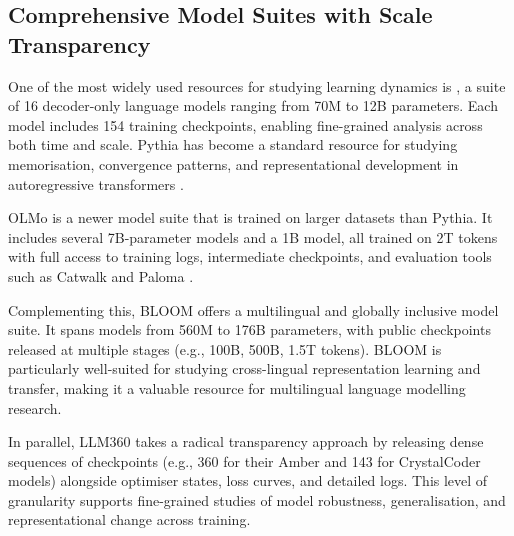 
\subsection{Comprehensive Model Suites with Scale Transparency}

One of the most widely used resources for studying learning dynamics is  \citep{biderman2023pythia}, a suite of 16 decoder-only language models ranging from 70M to 12B parameters. Each model includes 154 training checkpoints, enabling fine-grained analysis across both time and scale. Pythia has become a standard resource for studying memorisation, convergence patterns, and representational development in autoregressive transformers \citep{lesci2024causal,godey2024anisotropy,belrose2023eliciting}.

OLMo \citep{groeneveld2024olmo} is a newer model suite that is trained on larger datasets than Pythia. It includes several 7B-parameter models and a 1B model, all trained on 2T tokens with full access to training logs, intermediate checkpoints, and evaluation tools such as Catwalk \citep{groeneveld2023catwalk} and Paloma \citep{magnusson2024paloma}.

Complementing this, BLOOM \citep{le2023bloom} offers a multilingual and globally inclusive model suite. It spans models from 560M to 176B parameters, with public checkpoints released at multiple stages (e.g., 100B, 500B, 1.5T tokens). BLOOM is particularly well-suited for studying cross-lingual representation learning and transfer, making it a valuable resource for multilingual language modelling research.

In parallel, LLM360 \citep{liu2023llm360} takes a radical transparency approach by releasing dense sequences of checkpoints (e.g., 360 for their Amber and 143 for CrystalCoder models) alongside optimiser states, loss curves, and detailed logs. This level of granularity supports fine-grained studies of model robustness, generalisation, and representational change across training.

